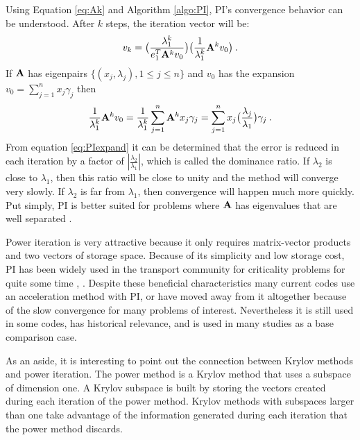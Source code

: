 Using Equation \eqref{eq:Ak} and Algorithm \ref{algo:PI}, PI's convergence behavior can be understood. After $k$ steps, the iteration vector will be: 
%
\begin{equation}
  v_{k} = \bigl( \frac{\lambda_{1}^{k}}{e_{1}^{T}\mathbf{A}^{k}v_{0}} \bigr) \bigl(\frac{1}{\lambda_{1}^{k}}\mathbf{A}^{k}v_{0} \bigr) \:.
\end{equation}
% 
If $\mathbf{A}$ has eigenpairs $\{(x_{j}, \lambda_{j}), 1 \le j \le n \}$ and $v_{0}$ has the expansion $v_{0} = \sum_{j=1}^{n} x_{j}\gamma_{j}$ then
%
\begin{equation}
  \frac{1}{\lambda_{1}^{k}}\mathbf{A}^{k}v_{0} =  \frac{1}{\lambda_{1}^{k}} \sum_{j=1}^{n} \mathbf{A}^{k}x_{j}\gamma_{j} = \sum_{j=1}^{n} x_{j} \bigl(\frac{\lambda_{j}}{\lambda_{1}} \bigr) \gamma_{j} \:.
  \label{eq:PIexpand}
\end{equation}
%
From equation \eqref{eq:PIexpand} it can be determined that the error is reduced in each iteration by a factor of $|\frac{\lambda_{2}}{\lambda_{1}}|$, which is called the dominance ratio. If $\lambda_2$ is close to $\lambda_1$, then this ratio will be close to unity and the method will converge very slowly. If $\lambda_2$ is far from $\lambda_1$, then convergence will happen much more quickly. Put simply, PI is better suited for problems where $\mathbf{A}$ has eigenvalues that are well separated \cite{Sorensen1996}.  

Power iteration is very attractive because it only requires matrix-vector products and two vectors of storage space. Because of its simplicity and low storage cost, PI has been widely used in the transport community for criticality problems for quite some time \cite{Lewis1993}, \cite{Warsa2004a}. Despite these beneficial characteristics many current codes use an acceleration method with PI, or have moved away from it altogether because of the slow convergence for many problems of interest. Nevertheless it is still used in some codes, has historical relevance, and is used in many studies as a base comparison case. 

As an aside, it is interesting to point out the connection between Krylov methods and power iteration. The power method is a Krylov method that uses a subspace of dimension one.  A Krylov subspace is built by storing the vectors created during each iteration of the power method. Krylov methods with subspaces larger than one take advantage of the information generated during each iteration that the power method discards. 

